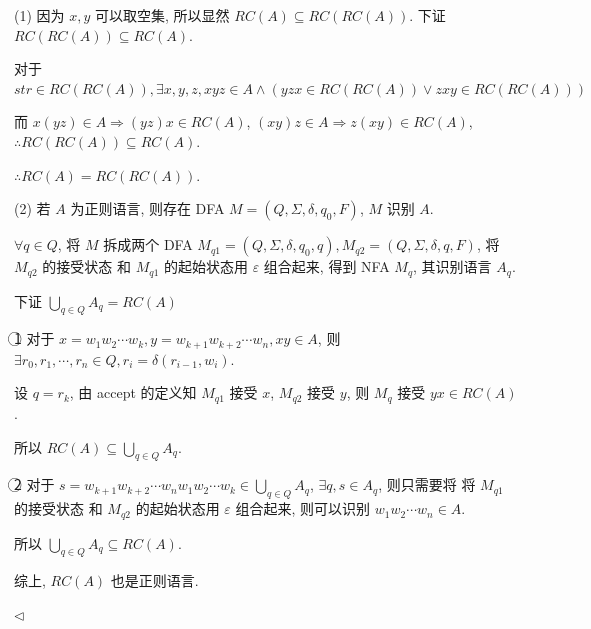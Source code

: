 \documentclass[11pt]{article}
\newenvironment{answer}[1][Answer]{\begin{trivlist}
		\item[\hskip \labelsep {\bfseries #1.}\hskip \labelsep]}{\hfill$\lhd$\end{trivlist}}
\begin{document}
	\begin{answer}
		(1) 因为 $x,y$ 可以取空集, 所以显然 $RC(A) \subseteq RC(RC(A))$. 下证 $RC(RC(A)) \subseteq RC(A)$.

        对于 $str\in RC(RC(A)), \exists x,y,z, xyz\in A \wedge(yzx\in RC(RC(A)) \vee zxy\in RC(RC(A)))$

        而 $x(yz)\in A \Rightarrow (yz)x\in RC(A)$, $(xy)z\in A \Rightarrow z(xy)\in RC(A)$, $\therefore RC(RC(A)) \subseteq RC(A)$.

        $\therefore RC(A) = RC(RC(A))$.
        
        (2) 若 $A$ 为正则语言, 则存在 DFA $M=(Q,\Sigma,\delta,q_0,F)$, $M$ 识别 $A$.
        
        $\forall q\in Q$, 将 $M$ 拆成两个 DFA $M_{q1}=(Q,\Sigma,\delta,q_0,q),M_{q2}=(Q,\Sigma,\delta,q,F)$, 将 $M_{q2}$ 的接受状态 和 $M_{q1}$ 的起始状态用 $\varepsilon$ 组合起来, 得到 NFA $M_q$, 其识别语言 $A_q$.
        
        下证 $\bigcup_{q\in Q} A_q=RC(A)$
        
        \textcircled{1} 对于 $x=w_1w_2\cdots w_k,y=w_{k+1}w_{k+2}\cdots w_n,xy\in A$, 则 $\exists r_0,r_1,\cdots,r_n\in Q,r_i=\delta(r_{i-1},w_i)$.
        
        设 $q=r_k$, 由 accept 的定义知 $M_{q1}$ 接受 $x$, $M_{q2}$ 接受 $y$, 则 $M_q$ 接受 $yx\in RC(A)$.
        
        所以 $RC(A)\subseteq\bigcup_{q\in Q} A_q$.
        
        \textcircled{2} 对于 $s=w_{k+1}w_{k+2}\cdots w_nw_1w_2\cdots w_k\in\bigcup_{q\in Q} A_q$, $\exists q,s\in A_q$, 则只需要将 将 $M_{q1}$ 的接受状态 和 $M_{q2}$ 的起始状态用 $\varepsilon$ 组合起来, 则可以识别 $w_1w_2\cdots w_n\in A$.
        
        所以 $\bigcup_{q\in Q} A_q\subseteq RC(A)$.
        
        综上, $RC(A)$ 也是正则语言.
        
	\end{answer}
\end{document}
